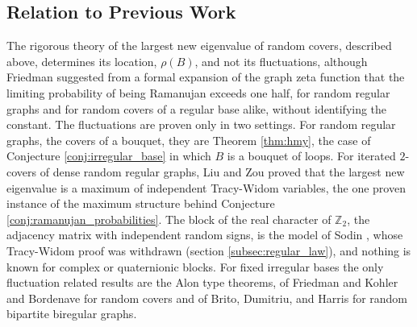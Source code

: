 \documentclass[12pt,oneside,english]{amsart}
\numberwithin{equation}{section}
\numberwithin{figure}{section}
\numberwithin{table}{section}
\theoremstyle{plain}
\numberwithin{thm}{section}
\theoremstyle{plain}
\theoremstyle{plain}
\theoremstyle{plain}
\theoremstyle{definition}
\theoremstyle{definition}
\theoremstyle{definition}
\theoremstyle{remark}
\begin{document}
\subsection{\label{subsec:previous_work}Relation to Previous Work}

The rigorous theory of the largest new eigenvalue of random covers,
described above, determines its location, $\rho(B)$, and not its fluctuations,
although Friedman \cite{Friedman2019} suggested from a formal expansion
of the graph zeta function that the limiting probability of being
Ramanujan exceeds one half, for random regular graphs and for random
covers of a regular base alike, without identifying the constant.
The fluctuations are proven only in two settings. For random regular
graphs, the covers of a bouquet, they are Theorem \ref{thm:hmy},
the case of Conjecture \ref{conj:irregular_base} in which $B$ is
a bouquet of loops. For iterated $2$-covers of dense random
regular graphs, Liu and Zou \cite{LiuZou2025} proved that the largest
new eigenvalue is a maximum of independent Tracy-Widom variables,
the one proven instance of the maximum structure behind Conjecture
\ref{conj:ramanujan_probabilities}. The block of the real character
of $\mathbb{Z}_{2}$, the adjacency matrix with independent random
signs, is the model of Sodin \cite{Sodin2009TracyWidom}, whose Tracy-Widom
proof was withdrawn (section \ref{subsec:regular_law}), and nothing
is known for complex or quaternionic blocks. For fixed irregular bases
the only fluctuation related results are the Alon type theorems, of
Friedman and Kohler and Bordenave for random covers and of Brito, Dumitriu,
and Harris \cite{BritoDumitriuHarris2022} for random bipartite biregular
graphs.
\end{document}
